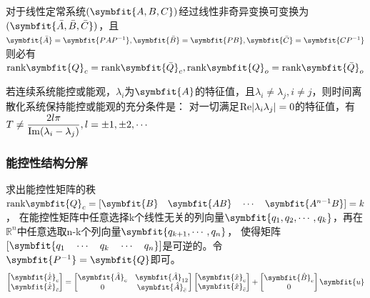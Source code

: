 \documentclass[11pt,a4paper]{ctexart}
\newcommand{\bm}{\symbfit}
\begin{document}
        对于线性定常系统$(\bm{A,B,C})$经过线性非奇异变换可变换为$(\bm{\bar A,\bar B,\bar C})$，且$\bm{\bar A}=\bm{PAP^{-1}},\bm{\bar B}=\bm{PB},\bm{\bar C}=\bm{CP^{-1}}$
        则必有${\rm rank}\bm{Q}_c={\rm rank}\bm{\bar Q}_c,{\rm rank}\bm{Q}_o={\rm rank}\bm{\bar Q}_o$

        若连续系统能控或能观，$\lambda_i$为$\bm{A}$的特征值，且$\lambda_i\neq\lambda_j,i\neq j$，则时间离散化系统保持能控或能观的充分条件是：
        对一切满足${\rm Re}|\lambda_i\-\lambda_j|=0$的特征值，有$T\neq\dfrac{2l\pi}{{\rm Im}(\lambda_i-\lambda_j)},l=\pm1,\pm2,\cdots$

        \subsubsection{能控性结构分解}
            求出能控性矩阵的秩${\rm rank}\bm{Q}_c=[\bm{B}\quad\bm{AB}\quad\cdots\quad\bm{A^{n-1}B}]=k$，
            在能控性矩阵中任意选择k个线性无关的列向量$\bm{q_1,q_2,\cdots,q_k}$，再在$\mathbb{R}^n$中任意选取n-k个列向量$\bm{q_{k+1},\cdots,q_n}$，
            使得矩阵$[\bm{q_1\quad\cdots\quad q_k\quad\cdots\quad q_n}]$是可逆的。令$\bm{P^{-1}}=\bm{Q}$即可。
            \[
            \begin{bmatrix}\bm{\dot{\hat x}}_c\\\bm{\dot{\hat x}}_{\bar c}\end{bmatrix}=
            \begin{bmatrix}\bm{\hat A}_c & \bm{\hat A}_{12}\\ 0 & \bm{\hat A}_{\bar c}\end{bmatrix}\begin{bmatrix}\bm{\hat x}_c\\\bm{\hat x}_{\bar c}\end{bmatrix}
            +\begin{bmatrix}\bm{\hat B}_c\\0\end{bmatrix}\bm{u}
            \]
\end{document}
